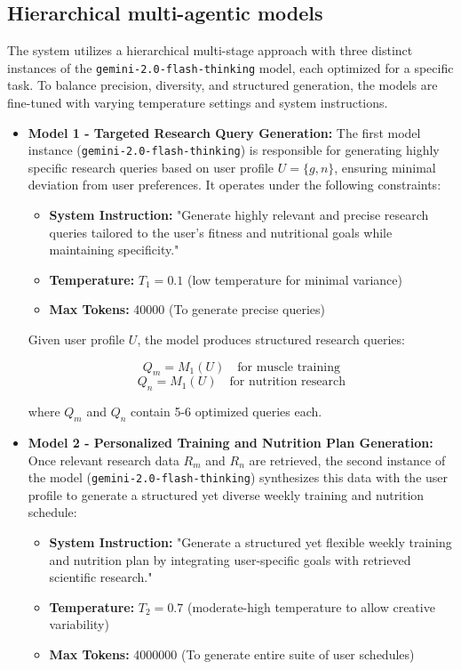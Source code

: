 \documentclass[conference]{IEEEtran}
\begin{document}
\subsection{Hierarchical multi-agentic models}
The system utilizes a hierarchical multi-stage approach with three distinct instances of the \texttt{gemini-2.0-flash-thinking} model, each optimized for a specific task. To balance precision, diversity, and structured generation, the models are fine-tuned with varying temperature settings and system instructions.

\begin{itemize}
    \item \textbf{Model 1 - Targeted Research Query Generation:}  
    The first model instance (\texttt{gemini-2.0-flash-thinking}) is responsible for generating highly specific research queries based on user profile $U = \{g, n\}$, ensuring minimal deviation from user preferences. It operates under the following constraints:

    \begin{itemize}
        \item \textbf{System Instruction:} "Generate highly relevant and precise research queries tailored to the user's fitness and nutritional goals while maintaining specificity."
        \item \textbf{Temperature:} $T_1 = 0.1$ (low temperature for minimal variance)
        \item \textbf{Max Tokens:} 40000 (To generate precise queries)
    \end{itemize}

    Given user profile $U$, the model produces structured research queries:
    
    \[
    Q_m = M_1(U) \quad \text{for muscle training}
    \]
    \[
    Q_n = M_1(U) \quad \text{for nutrition research}
    \]

    where $Q_m$ and $Q_n$ contain 5-6 optimized queries each.

    \item \textbf{Model 2 - Personalized Training and Nutrition Plan Generation:}  
    Once relevant research data $R_m$ and $R_n$ are retrieved, the second instance of the model (\texttt{gemini-2.0-flash-thinking}) synthesizes this data with the user profile to generate a structured yet diverse weekly training and nutrition schedule:

    \begin{itemize}
        \item \textbf{System Instruction:} "Generate a structured yet flexible weekly training and nutrition plan by integrating user-specific goals with retrieved scientific research."
        \item \textbf{Temperature:} $T_2 = 0.7$ (moderate-high temperature to allow creative variability)
        \item \textbf{Max Tokens:} 4000000 (To generate entire suite of user schedules)
    \end{itemize}


\end{itemize}
\end{document}
